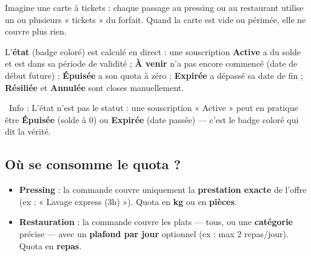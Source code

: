 \documentclass[12pt,a4paper]{article}
\newcommand{\info}[1]{\par\noindent\textcolor{lagoon}{\faInfoCircle\ Info : #1}\par}
\begin{document}
Imagine une carte à tickets : chaque passage au pressing ou au restaurant utilise un ou plusieurs « tickets » du forfait. Quand la carte est vide ou périmée, elle ne couvre plus rien.

\begin{center}
\end{center}

L'\textbf{état} (badge coloré) est calculé en direct : une souscription \textbf{Active} a du solde et est dans sa période de validité ; \textbf{À venir} n'a pas encore commencé (date de début future) ; \textbf{Épuisée} a son quota à zéro ; \textbf{Expirée} a dépassé sa date de fin ; \textbf{Résiliée} et \textbf{Annulée} sont closes manuellement.

\info{L'état n'est pas le statut : une souscription « Active » peut en pratique être \textbf{Épuisée} (solde à 0) ou \textbf{Expirée} (date passée) — c'est le badge coloré qui dit la vérité.}

\subsection{Où se consomme le quota ?}

\begin{itemize}[label=\textcolor{lagoon}{\faList}]
  \item \textbf{Pressing} : la commande couvre uniquement la \textbf{prestation exacte} de l'offre (ex : « Lavage express (3h) »). Quota en \textbf{kg} ou en \textbf{pièces}.
  \item \textbf{Restauration} : la commande couvre les plats — tous, ou une \textbf{catégorie} précise — avec un \textbf{plafond par jour} optionnel (ex : max 2 repas/jour). Quota en \textbf{repas}.
\end{itemize}
\end{document}
